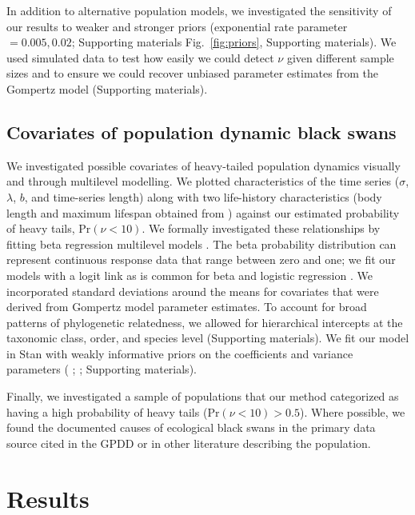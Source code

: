 In addition to alternative population models, we investigated the sensitivity
of our results to weaker and stronger priors (exponential rate parameter $=
0.005, 0.02$; Supporting materials Fig.~\ref{fig:priors}, Supporting materials). We used
simulated data to test how easily we could detect $\nu$ given different sample
sizes and to ensure we could recover unbiased parameter estimates from the
Gompertz model (Supporting materials).


\subsection{Covariates of population dynamic black swans}

We investigated possible covariates of heavy-tailed population dynamics
visually and through multilevel modelling. We plotted characteristics of the
time series ($\sigma$, $\lambda$, $b$, and time-series length) along with two
life-history characteristics (body length and maximum lifespan obtained from
\citet{brook2006a}) against our estimated probability of heavy tails, Pr$(\nu <
10)$. We formally investigated these relationships by fitting beta
regression multilevel models \citep{ferrari2004}. The beta probability
distribution can represent continuous response data that range between zero
and one; we fit our models with a logit link as is common for beta and logistic
regression \citep{ferrari2004}. We incorporated standard deviations around the
means for covariates that were derived from Gompertz model parameter
estimates. To account for broad patterns of phylogenetic relatedness, we
allowed for hierarchical intercepts at the taxonomic class, order, and species
level (Supporting materials). We fit our model in Stan with weakly
informative priors on the coefficients \citep{gelman2008d} and variance
parameters (\citeauthor{gelman2006c} \citeyear{gelman2006c};
\citeauthor{gelman2014} \citeyear{gelman2014}; Supporting materials).

Finally, we investigated a sample of populations that our method categorized as
having a high probability of heavy tails (Pr$(\nu < 10) > 0.5$). Where
possible, we found the documented causes of ecological black swans in the
primary data source cited in the GPDD or in other literature describing the
population.

\section{Results}

